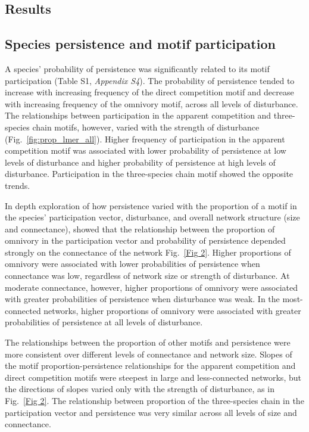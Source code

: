 \documentclass[12pt]{article}
\begin{document}
\begin{spacing}{2.0}
        

            
            

            
            




\section*{Results}

    \subsection*{Species persistence and motif participation} 

        A species' probability of persistence was significantly related to its motif participation (Table S1, \emph{Appendix S4}).
        The probability of persistence tended to increase with increasing frequency of the direct competition motif and decrease with increasing frequency of the omnivory motif, across all levels of disturbance.
        The relationships between participation in the apparent competition and three-species chain motifs, however, varied with the strength of disturbance (Fig.~\ref{fig:prop_lmer_all}).
        Higher frequency of participation in the apparent competition motif was associated with lower probability of persistence at low levels of disturbance and higher probability of persistence at high levels of disturbance.
        Participation in the three-species chain motif showed the opposite trends.
    

        In depth exploration of how persistence varied with the proportion of a motif in the species' participation vector, disturbance, and overall network structure (size and connectance), showed that the relationship between the proportion of omnivory in the participation vector and probability of persistence depended strongly on the connectance of the network Fig.~\ref{Fig 2}.
        Higher proportions of omnivory were associated with lower probabilities of persistence when connectance was low, regardless of network size or strength of disturbance.
        At moderate connectance, however, higher proportions of omnivory were associated with greater probabilities of persistence when disturbance was weak.
        In the most-connected networks, higher proportions of omnivory were associated with greater probabilities of persistence at all levels of disturbance. 

        The relationships between the proportion of other motifs and persistence were more consistent over different levels of connectance and network size.
        Slopes of the motif proportion-persistence relationships for the apparent competition and direct competition motifs were steepest in large and less-connected networks, but the directions of slopes varied only with the strength of disturbance, as in Fig.~\ref{Fig 2}.
        The relationship between proportion of the three-species chain in the participation vector and persistence was very similar across all levels of size and connectance.


\end{spacing}
\end{document}
